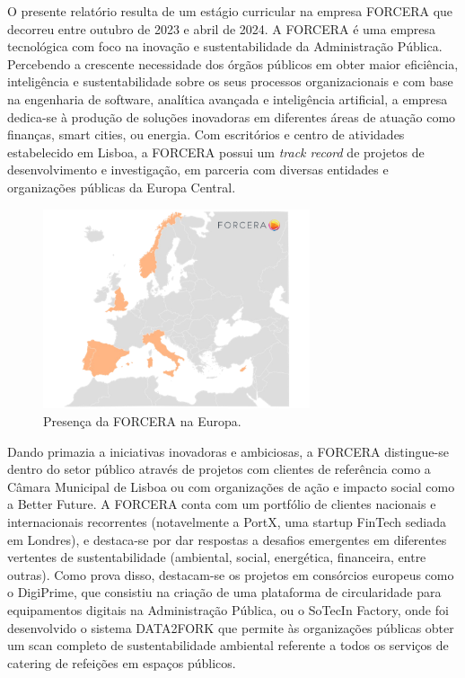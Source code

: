 O presente relatório resulta de um estágio curricular na empresa FORCERA que decorreu entre outubro de 2023 e abril de 2024. A FORCERA é uma empresa tecnológica com foco na inovação e sustentabilidade da Administração Pública. Percebendo a crescente necessidade dos órgãos públicos em obter maior eficiência, inteligência e sustentabilidade sobre os seus processos organizacionais e com base na engenharia de software, analítica avançada e inteligência artificial, a empresa dedica-se à produção de soluções inovadoras em diferentes áreas de atuação como finanças, smart cities, ou energia. 
Com escritórios e centro de atividades estabelecido em Lisboa, a FORCERA possui um \textit{track record} de projetos de desenvolvimento e investigação, em parceria com diversas entidades e organizações públicas da Europa Central.

\begin{figure}[H]
	\centering
	\includegraphics[width=0.7\textwidth]{imagens/forcera.png}
	\caption{Presença da FORCERA na Europa.}
	\label{fig:forcera}
\end{figure}


Dando primazia a iniciativas inovadoras e ambiciosas, a FORCERA distingue-se dentro do setor público através de projetos com clientes de referência como a Câmara Municipal de Lisboa ou com organizações de ação e impacto social como a Better Future. A FORCERA conta com um portfólio de clientes nacionais e internacionais recorrentes (notavelmente a PortX, uma startup FinTech sediada em Londres), e destaca-se por dar respostas a desafios emergentes em diferentes vertentes de sustentabilidade (ambiental, social, energética, financeira, entre outras). Como prova disso, destacam-se os projetos em consórcios europeus como o DigiPrime, que consistiu na criação de uma plataforma de circularidade para equipamentos digitais na Administração Pública, ou o SoTecIn Factory, onde foi desenvolvido o sistema DATA2FORK que permite às organizações públicas obter um scan completo de sustentabilidade ambiental referente a todos os serviços de catering de refeições em espaços públicos.

